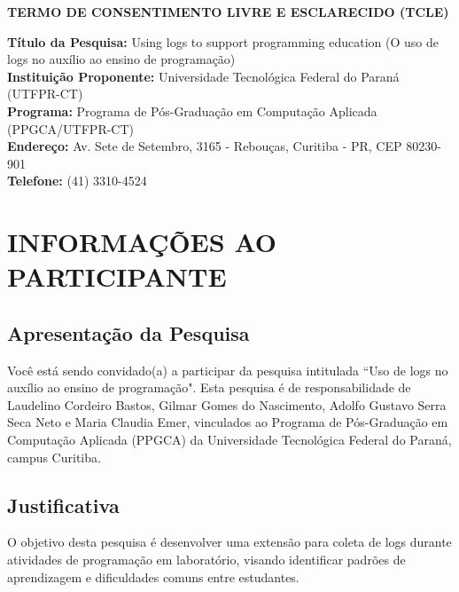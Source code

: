 \documentclass[12pt,a4paper]{article}
\begin{document}
	{\Large 
	\begin{center}
		\textbf{TERMO DE CONSENTIMENTO LIVRE E ESCLARECIDO (TCLE)}
	\end{center}
}
	\vspace{1em}
	
	\noindent
	\textbf{Título da Pesquisa:} Using logs to support programming education (O uso de logs no auxílio ao ensino de programação) \\
	\textbf{Instituição Proponente:} Universidade Tecnológica Federal do Paraná (UTFPR-CT)\\
	\textbf{Programa:} Programa de Pós-Graduação em Computação Aplicada (PPGCA/UTFPR-CT)\\
	\textbf{Endereço:} Av. Sete de Setembro, 3165 - Rebouças, Curitiba - PR, CEP 80230-901 \\
	\textbf{Telefone:} (41) 3310-4524 \\
	
	\vspace{\baselineskip}
	
	
	\section{INFORMAÇÕES AO PARTICIPANTE}
	
	\subsection{Apresentação da Pesquisa}
	
	\noindent Você está sendo convidado(a) a participar da pesquisa intitulada ``Uso de logs no auxílio ao ensino de programação". Esta pesquisa é de responsabilidade de Laudelino Cordeiro Bastos, Gilmar Gomes do Nascimento, Adolfo Gustavo Serra Seca Neto e Maria Claudia Emer, vinculados ao Programa de Pós-Graduação em Computação Aplicada (PPGCA) da Universidade Tecnológica Federal do Paraná, campus Curitiba.
	
	\subsection{Justificativa}
	O objetivo desta pesquisa é desenvolver uma extensão para coleta de logs durante atividades de programação em laboratório, visando identificar padrões de aprendizagem e dificuldades comuns entre estudantes.
	
\end{document}
